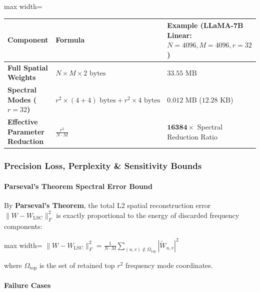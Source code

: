 \begin{center}
\begin{adjustbox}{max width=\columnwidth}
\renewcommand{\arraystretch}{1.2}
\begin{tabular}{lll}
\toprule
Component & Formula & Example (LLaMA-7B Linear: $N=4096, M=4096, r=32$) \\
\midrule
\textbf{Full Spatial Weights} & $N \times M \times 2 \text{ bytes}$ & $33.55 \text{ MB}$ \\
\textbf{Spectral Modes ($r=32$)} & $r^2 \times (4 + 4) \text{ bytes} + r^2 \times 4 \text{ bytes}$ & $0.012 \text{ MB}$ ($12.28 \text{ KB}$) \\
\textbf{Effective Parameter Reduction} & $\frac{r^2}{N \cdot M}$ & $\mathbf{16384\times}$ Spectral Reduction Ratio \\

\bottomrule
\end{tabular}
\end{adjustbox}
\end{center}

\subsubsection*{Precision Loss, Perplexity \& Sensitivity Bounds}

\paragraph{Parseval's Theorem Spectral Error Bound}

By \textbf{Parseval's Theorem}, the total L2 spatial reconstruction error $\| W - W_{\text{LSC}} \|_F^2$ is exactly proportional to the energy of discarded frequency components:

\begin{center}
\begin{adjustbox}{max width=\columnwidth}
$\displaystyle
\| W - W_{\text{LSC}} \|_F^2 = \frac{1}{N \cdot M} \sum_{(u, v) \notin \Omega_{\text{top}}} \left| \widetilde{W}_{u, v} \right|^2
$
\end{adjustbox}
\end{center}

where $\Omega_{\text{top}}$ is the set of retained top $r^2$ frequency mode coordinates.

\paragraph{Failure Cases}

